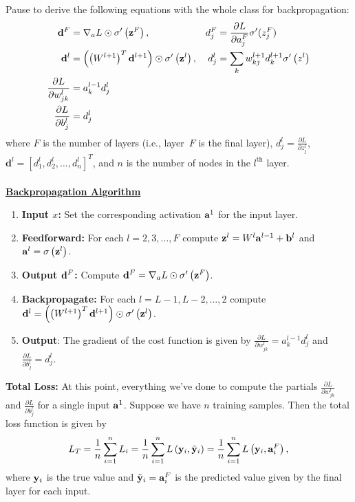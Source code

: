 \documentclass[12pt]{amsart}
\theoremstyle{definition}
\begin{document}
\begin{enumerate}[itemsep=2.5em,leftmargin=0pt]
\vspace{2.5em}

\noindent Pause to derive the following equations with the whole class for backpropagation:
\begin{align*}
    {\bf d}^F &= \nabla_a L \odot \sigma'\left({\bf z}^F\right),  & 
        d^F_j &= \frac{\partial L}{\partial a^F_j} \sigma'(z^F_j)  \\
    {\bf d}^l &= \left( \left( W^{l+1} \right)^T {\bf d}^{l+1} \right) \odot \sigma'\left({\bf z}^l\right),  &
        d^l_j &= \sum_k w^{l+1}_{kj} d^{l+1}_k \sigma'\left(z^l\right) \\
    \frac{\partial L}{\partial w^l_{jk}} &= a^{l-1}_k d^l_j \\
    \frac{\partial L}{\partial b^l_j} &= d^l_j
\end{align*}
where $F$ is the number of layers (i.e., layer~$F$ is the final layer), $\displaystyle d^l_j = \frac{\partial L}{\partial z^l_j}$, $\mathbf{d}^l = \left[d^l_1, d^l_2, \ldots, d^l_{n} \right]^T$, and $n$ is the number of nodes in the $l^{\text{th}}$ layer. \\ ~ \\

\noindent \underline{\textbf{Backpropagation Algorithm}} \\
\begin{enumerate}[label=\arabic*.,itemsep=1em]
    \item \textbf{Input $x$:} Set the corresponding activation ${\bf a}^1$ for the input layer.
    \item \textbf{Feedforward:} For each $l=2,3,\ldots, F$ compute ${\bf z}^l = W^l {\bf a}^{l-1} + {\bf b}^l$ and ${\bf a}^l = \sigma\left({\bf z}^l\right)$.
    \item \textbf{Output ${\bf d}^F$:} Compute ${\bf d}^F=\nabla_a L \odot \sigma'\left({\bf z}^F\right)$.
    \item \textbf{Backpropagate:} For each $l=L-1,L-2,\ldots,2$ compute ${\bf d}^l = \left( \left( W^{l+1} \right)^T {\bf d}^{l+1} \right) \odot \sigma'\left({\bf z}^l\right)$.
    \item \textbf{Output}: The gradient of the cost function is given by $\displaystyle \frac{\partial L}{\partial w^l_{jk}} = a^{l-1}_k d^l_j$ and $\displaystyle \frac{\partial L}{\partial b^l_j} = d^l_j$.
\end{enumerate}

\noindent \textbf{Total Loss:} At this point, everything we've done to compute the partials $\displaystyle \frac{\partial L}{\partial w^l_{jk}}$ and $\displaystyle \frac{\partial L}{\partial b^l_j}$ for a single input ${\bf a}^1$. Suppose we have $n$ training samples. Then the total loss function is given by 
    $$ L_{T} = \frac{1}{n}\sum_{i=1}^n L_i 
    = \frac{1}{n}\sum_{i=1}^n L\left( {\bf y}_i, \tilde{{\bf y}}_i \right) 
    = \frac{1}{n}\sum_{i=1}^n L\left( {\bf y}_i, {\bf a}^F_i \right), $$
where ${\bf y}_i$ is the true value and $\tilde{{\bf y}}_i={\bf a}^F_i$ is the predicted value given by the final layer for each input.


\end{enumerate}
\end{document}
